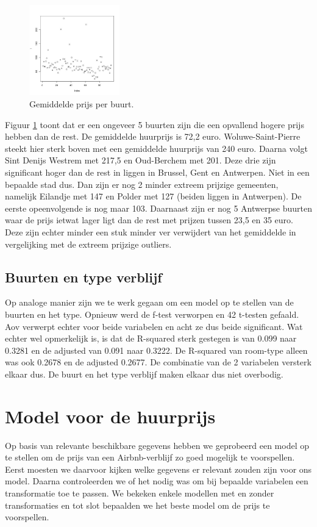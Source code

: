 \documentclass[a4paper,kulak]{kulakarticle} %
\begin{document}
\begin{figure}
	\begin{center}
		\includegraphics[width=0.35\textwidth]{pn.jpg}
	\end{center}
	\caption{Gemiddelde prijs per buurt.}
	\label{fig:pn}
\end{figure}
Figuur \ref{fig:pn} toont dat er een ongeveer 5 buurten zijn die een opvallend hogere prijs hebben dan de rest.
De gemiddelde huurprijs is 72,2 euro.
Woluwe-Saint-Pierre steekt hier sterk boven met een gemiddelde huurprijs van 240 euro.
Daarna volgt Sint Denijs Westrem met 217,5 en Oud-Berchem met 201.
Deze drie zijn significant hoger dan de rest in liggen in Brussel, Gent en Antwerpen. Niet in een bepaalde stad dus.
Dan zijn er nog 2 minder extreem prijzige gemeenten, namelijk Eilandje met 147 en Polder met 127 (beiden liggen in Antwerpen). De eerste opeenvolgende is nog maar 103.
Daarnaast zijn er nog 5 Antwerpse buurten waar de prijs ietwat lager ligt dan de rest met prijzen tussen 23,5 en 35 euro.
Deze zijn echter minder een stuk minder ver verwijdert van het gemiddelde in vergelijking met de extreem prijzige outliers.

\subsection{Buurten en type verblijf}
Op analoge manier zijn we te werk gegaan om een model op te stellen van de buurten en het type.
Opnieuw werd de f-test verworpen en 42 t-testen gefaald.
Aov verwerpt echter voor beide variabelen en acht ze dus beide significant.
Wat echter wel opmerkelijk is, is dat de R-squared sterk gestegen is van 0.099 naar 0.3281 en de adjusted van 0.091 naar 0.3222.
De R-squared van room-type alleen was ook 0.2678 en de adjusted 0.2677. De combinatie van de 2 variabelen versterk elkaar dus.
De buurt en het type verblijf maken elkaar dus niet overbodig.




\section{Model voor de huurprijs} \label{sec:mh}
Op basis van relevante beschikbare gegevens hebben we geprobeerd een model op te stellen om de prijs van een Airbnb-verblijf zo goed mogelijk te voorspellen. Eerst moesten we daarvoor kijken welke gegevens er relevant zouden zijn voor ons model. Daarna controleerden we of het nodig was om bij bepaalde variabelen een transformatie toe te passen. We bekeken enkele modellen met en zonder transformaties en tot slot bepaalden we het beste model om de prijs te voorspellen.
\end{document}
